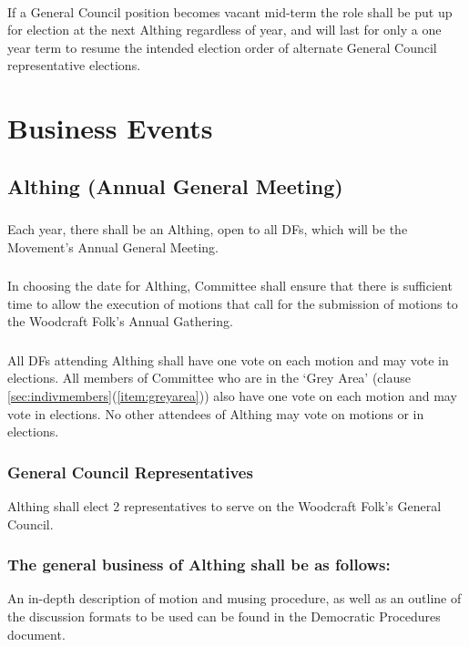 \documentclass[a4paper, 11pt]{report}
\begin{document}
\paragraph{} If a General Council position becomes vacant mid-term the role shall be put up for election at the next Althing regardless of year, and will last for only a one year term to resume the intended election order of alternate General Council representative elections.


\section{Business Events}
\label{sec:business}
\subsection{Althing (Annual General Meeting)}
\label{sec:althing}
\subsubsection{}
Each year, there shall be an Althing, open to all DFs, which will be the Movement's Annual General Meeting.
\subsubsection{}
In choosing the date for Althing, Committee shall ensure that there is sufficient time to allow the execution of motions that call for the submission of motions to the Woodcraft Folk's Annual Gathering.
\subsubsection{}
All DFs attending Althing shall have one vote on each motion and may vote in elections. All members of Committee  who are in the `Grey Area' (clause \ref{sec:indivmembers}(\ref{item:greyarea})) also have one vote on each motion and may vote in elections. No other attendees of Althing may vote on motions or in elections.
\subsubsection{General Council Representatives}
Althing shall elect 2 representatives to serve on the Woodcraft Folk's General Council.
\subsubsection{The general business of Althing shall be as follows:}
An in-depth description of motion and musing procedure, as well as an outline of the discussion formats to be used can be found in the Democratic Procedures document.
\end{document}

